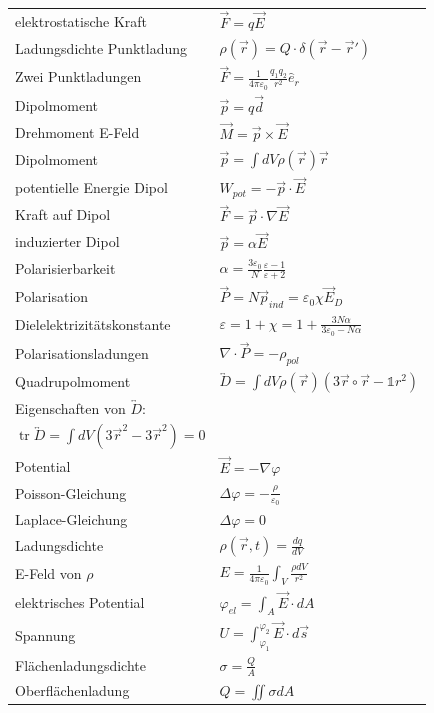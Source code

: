 \documentclass[12pt,a4paper]{article}
\DeclareMathOperator{\tr}{tr}
\renewcommand{\d}[2]{\frac{d #1}{d #2}}
\renewcommand{\=}[1]{\stackrel{#1}{=}}
\theoremstyle{definition}
\theoremstyle{remark}
\begin{document}
\begin{center}
\begin{minipage}[t]{.5\linewidth}
\vspace{0pt}
\noindent\begin{tabular}{ll}
elektrostatische Kraft & $\vec F = q \vec{E}$\\
Ladungsdichte Punktladung & $\rho(\vec r) = Q \cdot \delta(\vec r - \vec r')$\\
Zwei Punktladungen & $\vec F = \frac{1}{4\pi \varepsilon_0} \frac{q_1 q_2}{r^2}\hat{e}_r$\\
\midrule
Dipolmoment & $\vec p = q \vec d$\\
Drehmoment E-Feld & $\vec{M} = \vec{p} \times \vec{E}$\\
Dipolmoment & $\vec p = \int dV \rho(\vec r) \vec r$\\
potentielle Energie Dipol & $W_{pot} = - \vec{p} \cdot \vec{E}$\\
Kraft auf Dipol &  $\vec{F} = \vec{p} \cdot \nabla \vec{E}$\\
induzierter Dipol & $\vec p = \alpha \vec E$\\
Polarisierbarkeit & $\alpha = \frac{3\varepsilon_0}{N} \frac{\varepsilon - 1}{\varepsilon + 2}$\\
Polarisation &  $\vec{P} = N \vec{p}_{ind} = \varepsilon_0 \chi \vec{E}_{D}$\\
Dielelektrizitätskonstante & $\varepsilon = 1 + \chi = 1 + \frac{3N \alpha}{3\varepsilon_0 - N\alpha}$\\
Polarisationsladungen &  $\nabla \cdot \vec{P} = - \rho_{pol}$\\
\midrule
Quadrupolmoment & $\overleftrightarrow D = \int dV \rho(\vec r) (3 \vec r \circ \vec r - \mathbb{1} r^2)$\\
Eigenschaften von $\overleftrightarrow D$: & \makecell[l]{$D_{ij} = D_{ji}$ \\ $\tr \overleftrightarrow D = \int dV (3 \vec r^2 - 3 \vec r^2) = 0$}\\
\midrule
Potential & $\vec E = -\nabla \varphi$\\
Poisson-Gleichung & $\Delta \varphi = -\frac{\rho}{\varepsilon_0}$\\
Laplace-Gleichung & $\Delta \varphi = 0$\\
Ladungsdichte & $\rho (\vec r, t) = \d{q}{V}$\\
E-Feld von $\rho$ & $E = \frac{1}{4\pi\varepsilon_0} \int_V \frac{\rho dV}{r^2}$\\
elektrisches Potential & $\varphi_{el} = \int_A \vec{E} \cdot dA$\\
Spannung  & $U = \int_{\varphi_1}^{\varphi_2} \vec{E} \cdot d\vec{s}$\\
Flächenladungsdichte & $\sigma = \frac{Q}{A}$\\
Oberflächenladung & $Q = \iint \sigma dA $\\
\end{tabular}
\end{minipage}%
\begin{minipage}[t]{.5\linewidth}
\vspace{0pt}
\begin{tabular}{ll}
\toprule


\end{tabular}
\end{minipage}
\end{center}
\end{document}
